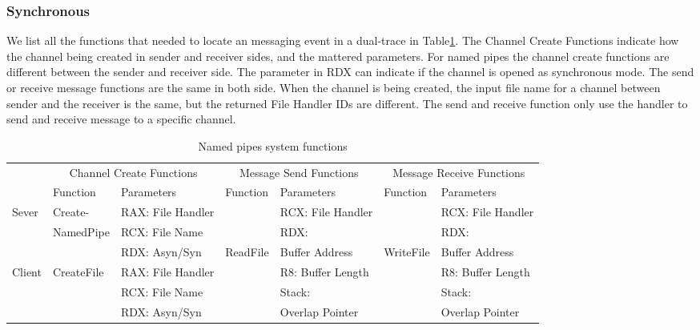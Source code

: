 \documentclass[paper=a4, fontsize=11pt]{scrartcl}
\numberwithin{equation}{section}		%
\numberwithin{figure}{section}			%
\numberwithin{table}{section}				%
\begin{document}
\subsubsection{Synchronous}
We list all the functions that needed to locate an messaging event in a dual-trace in Table\ref{synfunctions}. The Channel Create Functions indicate how the channel being created in sender and receiver sides, and the mattered parameters. For named pipes the channel create functions are different between the sender and receiver side. The parameter in RDX can indicate if the channel is opened as synchronous mode. The send or receive message functions are the same in both side. When the channel is being created, the input file name for a channel between sender and the receiver is the same, but the returned File Handler IDs are different. The send and receive function only use the handler to send and receive message to a specific channel. 
\begin{table}[h]
        \centering
        \caption{Named pipes system functions}
        \label{synfunctions}
        \begin{tabular}{|l|l|l|l|l|l|l|}
            \hline
             \multirow{2}{*}{} &
               \multicolumn{2}{c|}{Channel Create Functions} &
               \multicolumn{2}{c|}{Message Send Functions} &
               \multicolumn{2}{c|}{Message Receive Functions} \\
             \cline{2-7}
              & Function& Parameters & Function & Parameters  & Function & Parameters\\
             \hline
             Sever& Create-&  RAX: File Handler &  &  RCX: File Handler &&RCX: File Handler\\
             \cline{3-3} \cline{5-5} \cline{7-7}
             &NamedPipe&RCX: File Name && RDX:  &&RDX: \\
              \cline{3-3} 
             &&RDX: Asyn/Syn&ReadFile& Buffer Address &WriteFile&Buffer Address\\
                \cline{1-3} \cline{5-5} \cline{7-7}
             Client & CreateFile & RAX: File Handler & &  R8: Buffer Length &&R8: Buffer Length\\
              \cline{3-3} \cline{5-5} \cline{7-7}
             &&RCX: File Name &&Stack:&&Stack:\\
             \cline{3-3} 
             &&RDX: Asyn/Syn&& Overlap Pointer&&Overlap Pointer\\
            \hline
        \end{tabular}
    \end{table}
\end{document}

